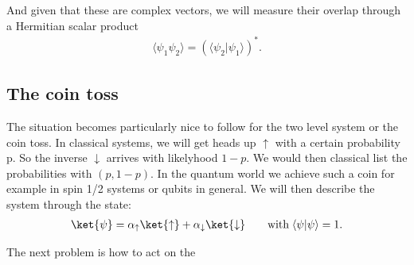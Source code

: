 And given that these are complex vectors, we will measure their overlap through a Hermitian scalar product
\begin{align}
				\langle\psi_1 \psi_2\rangle=(\langle{\psi_2}| \psi_1\rangle)^*.
\end{align}
\subsection{The coin toss}
The situation becomes particularly nice to follow for the two level system or the coin toss. In classical systems, we will get heads up $\uparrow$ with a certain probability p. So the inverse $\downarrow$ arrives with likelyhood $1-p$. We would then classical list the probabilities with $(p,1-p)$. In the quantum world we achieve such a coin for example in spin 1/2 systems or qubits in general. We will then describe the system through the state:
\begin{align}
	\ket{\psi} = \alpha_\uparrow \ket{\uparrow} + \alpha_\downarrow \ket{\downarrow}  \qquad \text{with} \; \langle\psi | \psi\rangle = 1.
\end{align}

The next problem is how to act on the 